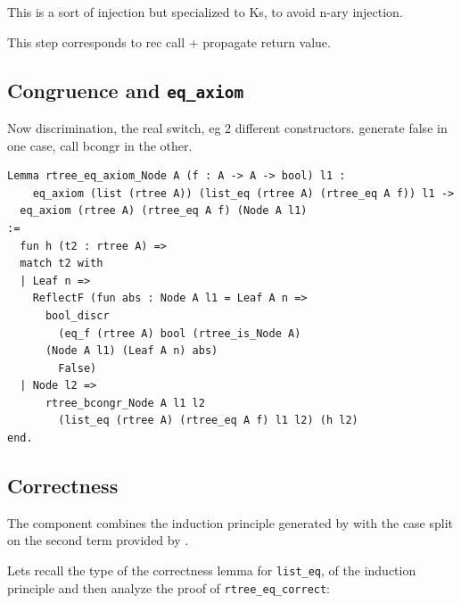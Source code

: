 \documentclass[sigplan,10pt,review]{acmart}\settopmatter{printfolios=true,printccs=false,printacmref=false}
\newcommand{\derive}[1]{\keys{#1}}
\begin{document}
This is a sort of injection but specialized to Ks, to avoid n-ary
injection.

This step corresponds to rec call + propagate return value.

\subsection{Congruence and \lstinline+eq_axiom+} %

Now discrimination, the real switch, eg 2 different constructors.
generate false in one case, call bcongr in the other.

\begin{minipage}{\textwidth}\begin{lstlisting}
Lemma rtree_eq_axiom_Node A (f : A -> A -> bool) l1 :
    eq_axiom (list (rtree A)) (list_eq (rtree A) (rtree_eq A f)) l1 ->
  eq_axiom (rtree A) (rtree_eq A f) (Node A l1)
:=
  fun h (t2 : rtree A) =>
  match t2 with
  | Leaf n =>
    ReflectF (fun abs : Node A l1 = Leaf A n =>
      bool_discr
        (eq_f (rtree A) bool (rtree_is_Node A)
	  (Node A l1) (Leaf A n) abs)
        False)
  | Node l2 =>
      rtree_bcongr_Node A l1 l2
        (list_eq (rtree A) (rtree_eq A f) l1 l2) (h l2)
end.
\end{lstlisting}\end{minipage}

\subsection{Correctness} %
\label{sec:derive:eqcorrect}

The \derive{eqcorrect} component combines the induction
principle generated by \derive{induction} with the
case split on the second term provided by \derive{eqK}.

Lets recall the type of the correctness lemma for
\lstinline+list_eq+, of the induction principle
and then analyze the proof of
\lstinline+rtree_eq_correct+:
\end{document}

